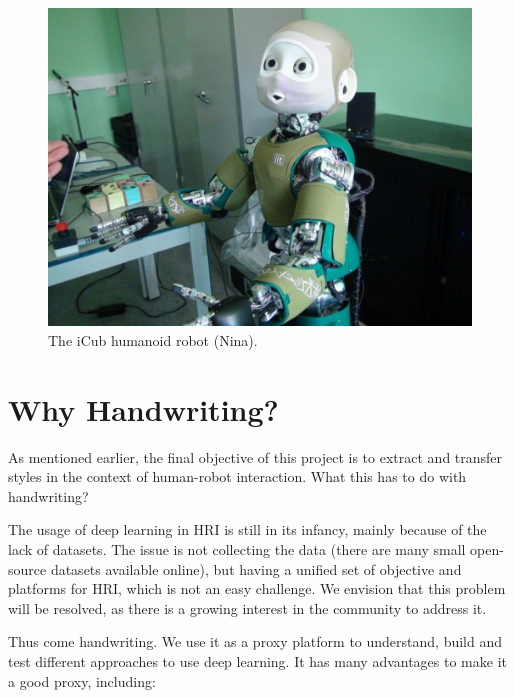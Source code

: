\begin{figure}[!htbp]
  \begin{center}
    \includegraphics[scale=0.3]{./images/introduction/nina_robot.jpg}
  \end{center}
  \caption{The iCub humanoid robot (Nina).}
  \label{fig:nina_robot}
\end{figure}

\section{Why Handwriting?}
  \par As mentioned earlier, the final objective of this project is to extract and transfer styles in the context of human-robot interaction. What this has to do with handwriting?
  \par The usage of deep learning in HRI is still in its infancy, mainly because of the lack of datasets. The issue is not collecting the data (there are many small open-source datasets available online), but having a unified set of objective and platforms for HRI, which is not an easy challenge. We envision that this problem will be resolved, as there is a growing interest in the community to address it.

  \par Thus come handwriting. We use it as a proxy platform to understand, build and test different approaches to use deep learning. It has many advantages to make it a good proxy, including:

